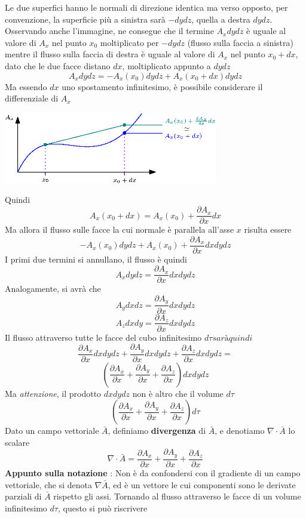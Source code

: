 \documentclass[10pt, letterpaper]{report}
\begin{document}
Le due superfici hanno le normali di direzione identica ma verso opposto, per convenzione, la superficie più a sinistra sarà $-dydz$, quella a destra $dydz$. Osservando anche l'immagine, ne consegue che il termine $A_xdydz$ è uguale al valore di $A_x$ nel punto $x_0$ moltiplicato per $-dydz$ (flusso sulla faccia a sinistra) mentre il flusso sulla faccia di destra è uguale al valore di $A_x$ nel punto $x_0+dx$, dato che le due facce distano $dx$, moltiplicato appunto a $dydz$
$$ A_xdydz=-A_x(x_0)dydz+A_x(x_0+dx)dydz $$
Ma essendo $dx$ uno spostamento infinitesimo, è possibile considerare il differenziale di $A_x$\begin{center}
    \includegraphics[width=0.7\textwidth]{images/Differenziale3.eps}
\end{center}
Quindi 
$$A_x(x_0+dx)=A_x(x_0)+\frac{\partial A_x}{\partial x}dx $$
Ma allora il flusso sulle facce la cui normale è parallela all'asse $x$ risulta essere 
$$ -A_x(x_0)dydz+A_x(x_0)+\frac{\partial A_x}{\partial x}dxdydz$$
I primi due termini si annullano, il flusso è quindi 
$$A_xdydz=\frac{\partial A_x}{\partial x}dxdydz$$
Analogamente, si avrà che 
$$A_ydxdz=\frac{\partial A_y}{\partial x}dxdydz$$
$$A_zdxdy=\frac{\partial A_z}{\partial x}dxdydz$$
Il flusso attraverso tutte le facce del cubo infinitesimo $d\tau sarà quindi$
$$ \frac{\partial A_x}{\partial x}dxdydz+\frac{\partial A_y}{\partial x}dxdydz+\frac{\partial A_z}{\partial x}dxdydz=$$
$$ (\frac{\partial A_x}{\partial x}+\frac{\partial A_y}{\partial x}+\frac{\partial A_z}{\partial x})dxdydz$$
Ma \textit{attenzione}, il prodotto $dxdydz$ non è altro che il volume $d\tau$
$$ (\frac{\partial A_x}{\partial x}+\frac{\partial A_y}{\partial x}+\frac{\partial A_z}{\partial x})d\tau$$
 Dato un campo vettoriale $\bar A$, definiamo \textbf{divergenza} di $\bar A$, e denotiamo $\nabla \cdot \bar A$ lo scalare 
$$\nabla \cdot \bar A= \frac{\partial A_x}{\partial x}+\frac{\partial A_y}{\partial x}+\frac{\partial A_z}{\partial x}$$
\textbf{Appunto sulla notazione} : Non è da confondersi con il gradiente di un campo vettoriale, che si denota $\nabla \bar A$, ed è un vettore le cui componenti sono le derivate parziali di $\bar A$ rispetto gli assi.\acc 
Tornando al flusso attraverso le facce di un volume infinitesimo $d\tau$, questo si può riscrivere 
\end{document}
